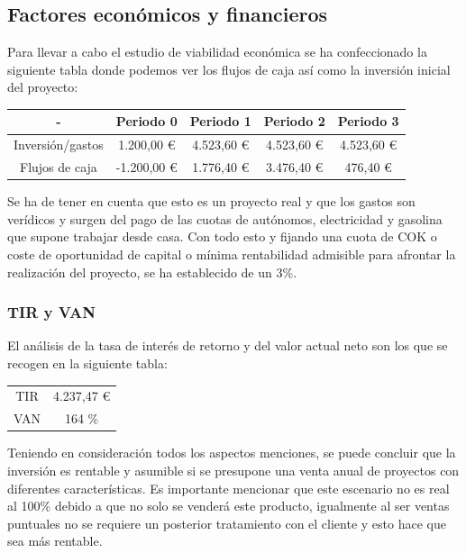 \documentclass[paper=a4, fontsize=11pt,twoside]{scrartcl}	%
\begin{document}
    \subsection{Factores económicos y financieros}
        Para llevar a cabo el estudio de viabilidad económica se ha confeccionado la siguiente tabla donde
        podemos ver los flujos de caja así como la inversión inicial del proyecto:
        \begin{center}
            \begin{tabular}{||c | c |c |c |c ||} 
            \hline
             - & Periodo 0 & Periodo 1& Periodo 2 & Periodo 3  \\ [0.5ex] 
            \hline
            \hline
                Inversión/gastos &1.200,00 € 	& 4.523,60 € 	& 4.523,60 € 	& 4.523,60 € \\ 
                Flujos de caja  &-1.200,00 € 	& 1.776,40 € 	& 3.476,40 € 	& 476,40 €   \\ 
            \hline
            \end{tabular}
        \end{center}
        Se ha de tener en cuenta que esto es un proyecto real y que los gastos son verídicos y surgen del pago de
        las cuotas de autónomos, electricidad y gasolina que supone trabajar desde casa. Con todo esto y fijando una cuota
        de COK o coste de oportunidad de capital o mínima rentabilidad admisible para afrontar la realización del
        proyecto, se ha establecido de un 3\%.
    \subsubsection{TIR y VAN}
        El análisis de la tasa de interés de retorno y del valor actual neto son los que se recogen en la siguiente tabla:
        \begin{center}
            \begin{tabular}{||c | c ||} 
            \hline
                TIR &4.237,47 € \\ [0.5ex] 
                VAN & 164 \% \\ [0.5ex] 
            \hline
            \end{tabular}
        \end{center}
        Teniendo en consideración todos los aspectos menciones, se puede concluir que la inversión es rentable y asumible
        si se presupone una venta anual de proyectos con diferentes características.
        Es importante mencionar que este escenario no es real al 100\% debido a que no solo se venderá este producto, igualmente al ser 
        ventas puntuales no se requiere un posterior tratamiento con el cliente y esto hace que sea más rentable.
\end{document}
